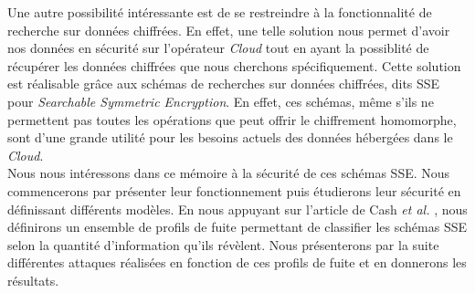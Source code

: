 Une autre possibilité intéressante est de se restreindre à la fonctionnalité de
recherche sur données chiffrées. En effet, une telle solution nous permet
d'avoir nos données en sécurité sur l'opérateur \textit{Cloud} tout en ayant la
possiblité de récupérer les données chiffrées que nous cherchons spécifiquement.
Cette solution est réalisable grâce aux schémas de recherches sur données
chiffrées, dits SSE pour \textit{Searchable Symmetric Encryption}. En effet,
ces schémas, même s'ils ne permettent pas toutes les opérations que peut offrir
le chiffrement homomorphe, sont d'une grande utilité pour les besoins actuels
des données hébergées dans le \textit{Cloud}.\\

Nous nous intéressons dans ce mémoire à la sécurité de ces schémas SSE. Nous
commencerons par présenter leur fonctionnement puis étudierons leur sécurité en
définissant différents modèles. En nous appuyant sur l'article de Cash
\textit{et al.} \cite{ref2}, nous définirons un ensemble de profils de fuite
permettant de classifier les schémas SSE selon la quantité d'information qu'ils
révèlent. Nous présenterons par la suite différentes attaques réalisées en
fonction de ces profils de fuite et en donnerons les résultats.
